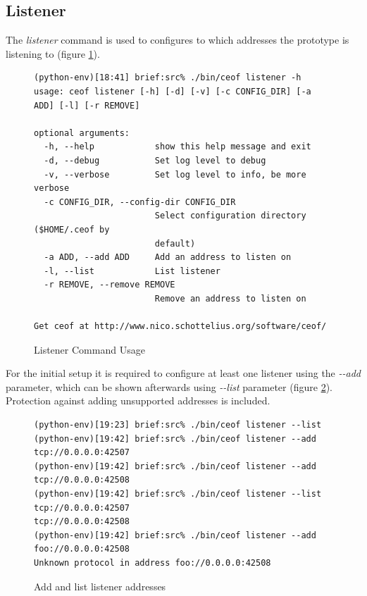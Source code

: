 \subsection{Listener}
The \textit{listener} command is used
to configures to which addresses the prototype is listening to (figure
\ref{listenerusage}).
\begin{figure}[htbp]
\caption{Listener Command Usage}
\label{listenerusage}
\begin{verbatim}
(python-env)[18:41] brief:src% ./bin/ceof listener -h
usage: ceof listener [-h] [-d] [-v] [-c CONFIG_DIR] [-a ADD] [-l] [-r REMOVE]

optional arguments:
  -h, --help            show this help message and exit
  -d, --debug           Set log level to debug
  -v, --verbose         Set log level to info, be more verbose
  -c CONFIG_DIR, --config-dir CONFIG_DIR
                        Select configuration directory ($HOME/.ceof by
                        default)
  -a ADD, --add ADD     Add an address to listen on
  -l, --list            List listener
  -r REMOVE, --remove REMOVE
                        Remove an address to listen on

Get ceof at http://www.nico.schottelius.org/software/ceof/
\end{verbatim}
\end{figure}
For the initial setup it is required to configure at least one listener
using the \textit{-{}-add} parameter, which can be shown afterwards using
\textit{-{}-list} parameter (figure \ref{addandlistlistener}). 
Protection against adding unsupported addresses is included.
\begin{figure}[htbp][htb]
\caption{Add and list listener addresses}
\label{addandlistlistener}
\begin{verbatim}
(python-env)[19:23] brief:src% ./bin/ceof listener --list
(python-env)[19:42] brief:src% ./bin/ceof listener --add tcp://0.0.0.0:42507
(python-env)[19:42] brief:src% ./bin/ceof listener --add tcp://0.0.0.0:42508
(python-env)[19:42] brief:src% ./bin/ceof listener --list                   
tcp://0.0.0.0:42507
tcp://0.0.0.0:42508
(python-env)[19:42] brief:src% ./bin/ceof listener --add foo://0.0.0.0:42508 
Unknown protocol in address foo://0.0.0.0:42508
\end{verbatim}
\end{figure}
